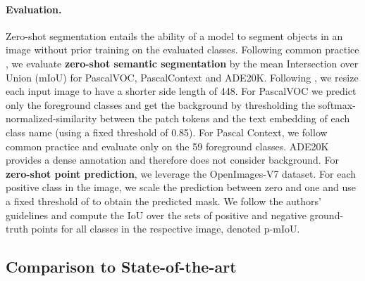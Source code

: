 \documentclass[10pt,twocolumn,letterpaper]{article}
\begin{document}
\paragraph{Evaluation.}
Zero-shot segmentation entails the ability of a model to segment objects in an image without prior training on the evaluated classes.
Following common practice \citep{xu2022groupvit, luo2023segclip, xu2023learning}, we evaluate \textbf{zero-shot semantic segmentation} by the mean Intersection over Union (mIoU) for PascalVOC, PascalContext and ADE20K.
Following \citep{xu2022groupvit}, we resize each input image to have a shorter side length of 448.
For PascalVOC we predict only the foreground classes and get the background by thresholding the softmax-normalized-similarity between the patch tokens and the text embedding of each class name (using a fixed threshold of 0.85).
For Pascal Context, we follow common practice and evaluate only on the 59 foreground classes.
ADE20K provides a dense annotation and therefore does not consider background. 
For \textbf{zero-shot point prediction}, we leverage the OpenImages-V7 dataset. For each positive class in the image, we scale the prediction between zero and one 
and use a fixed threshold of  to obtain the predicted mask. We follow the authors' guidelines \citep{benenson2022colouring} and compute the IoU over the sets of positive and negative ground-truth points for all classes in the respective image, denoted p-mIoU. 

\subsection{Comparison to State-of-the-art}
\end{document}
